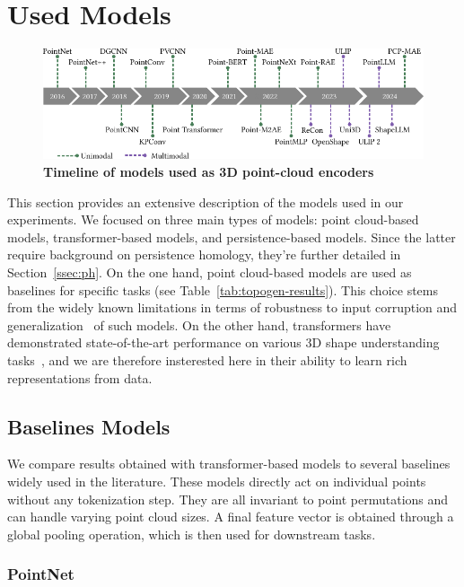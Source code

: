 \section{Used Models}
\label{sec:used_models}

\begin{figure}[h]
  \centering
  \includegraphics[width=1.0\linewidth]{figs/timeline.pdf}
  \caption{\textbf{Timeline of models used as 3D point-cloud encoders}}
  \label{fig:timeline}
\end{figure}

This section provides an extensive description of the models used in our experiments. We focused on three main types of models: point cloud-based models, transformer-based models, and persistence-based models. Since the latter require background on persistence homology, they're further detailed in Section~\ref{ssec:ph}. On the one hand, point cloud-based models are used as baselines for specific tasks (see Table~\ref{tab:topogen-results}). This choice stems from the widely known limitations in terms of robustness to input corruption and generalization~\cite{set-transformer} of such models. On the other hand, transformers have demonstrated state-of-the-art performance on various 3D shape understanding tasks~\cite{pbert,pmae,pm2ae,pcpmae}, and we are therefore insterested here in their ability to learn rich representations from data. 

\subsection{Baselines Models}
\label{ssec:baselines_models} 

We compare results obtained with transformer-based models to several baselines widely used in the literature. These models directly act on individual points without any tokenization step. They are all invariant to point permutations and can handle varying point cloud sizes. A final feature vector is obtained through a global pooling operation, which is then used for downstream tasks.

\subsubsection{PointNet}

